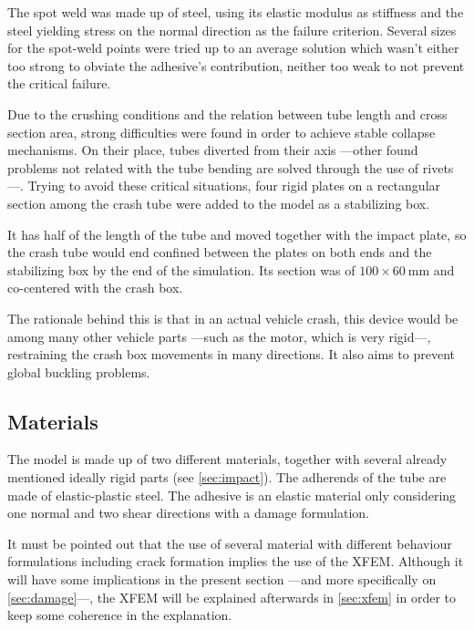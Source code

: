 \documentclass[cmfonts]{witpress}
\begin{document}

The spot weld was made up of steel, using its elastic modulus as stiffness and the steel yielding stress on the normal direction as the failure criterion. Several sizes for the spot-weld points were tried up to an average solution which wasn't either too strong to obviate the adhesive's contribution, neither too weak to not prevent the critical failure.


Due to the crushing conditions and the relation between tube length and cross section area, strong difficulties were found in order to achieve stable collapse mechanisms. On their place, tubes diverted from their axis ---other found problems not related with the tube bending are solved through the use of rivets---. Trying to avoid these critical situations, four rigid plates on a rectangular section among the crash tube were added to the model as a stabilizing box.

It has half of the length of the tube and moved together with the impact plate, so the crash tube would end confined between the plates on both ends and the stabilizing box by the end of the simulation. Its section was of $\num{100}\times\SI{60}{\mm}$ and co-centered with the crash box.

The rationale behind this is that in an actual vehicle crash, this device would be among many other vehicle parts ---such as the motor, which is very rigid---, restraining the crash box movements in many directions. It also aims to prevent global buckling problems.

\subsection{Materials}

The model is made up of two different materials, together with several already mentioned ideally rigid parts (see \cref{sec:impact}). The adherends of the tube are made of elastic-plastic steel. The adhesive is an elastic material only considering one normal and two shear directions with a damage formulation.

It must be pointed out that the use of several material with different behaviour formulations including crack formation implies the use of the XFEM. Although it will have some implications in the present section ---and more specifically on \cref{sec:damage}---, the XFEM will be explained afterwards in \cref{sec:xfem} in order to keep some coherence in the explanation.
\end{document}

